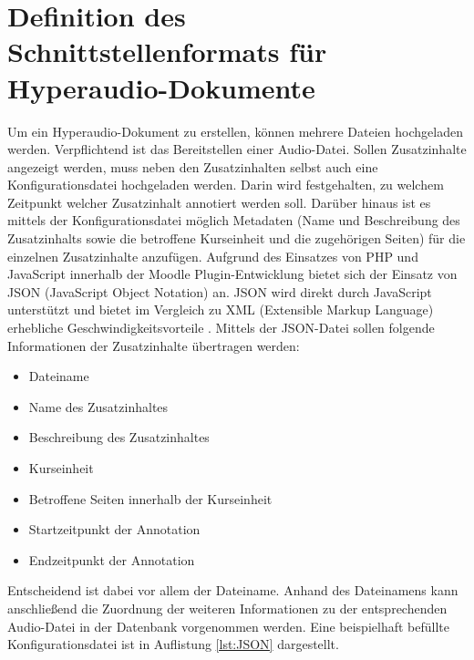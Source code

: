 \section{Definition des Schnittstellenformats für Hyperaudio-Dokumente}
\label{sec:konfigurationsdatei}
Um ein Hyperaudio-Dokument zu erstellen, können mehrere Dateien hochgeladen werden. Verpflichtend ist das Bereitstellen einer Audio-Datei. Sollen Zusatzinhalte angezeigt werden, muss neben den Zusatzinhalten selbst auch eine Konfigurationsdatei hochgeladen werden. Darin wird festgehalten, zu welchem Zeitpunkt welcher Zusatzinhalt annotiert werden soll. Darüber hinaus ist es mittels der Konfigurationsdatei möglich Metadaten (Name und Beschreibung des Zusatzinhalts sowie die betroffene Kurseinheit und die zugehörigen Seiten) für die einzelnen Zusatzinhalte anzufügen.
Aufgrund des Einsatzes von PHP und JavaScript innerhalb der Moodle Plugin-Entwicklung bietet sich der Einsatz von JSON (JavaScript Object Notation) an. JSON wird direkt durch JavaScript unterstützt und bietet im Vergleich zu XML (Extensible Markup Language) erhebliche Geschwindigkeitsvorteile \citep{nurseitov2009comparison}.
Mittels der JSON-Datei sollen folgende Informationen der Zusatzinhalte übertragen werden:

\begin{itemize}
\item Dateiname
\item Name des Zusatzinhaltes
\item Beschreibung des Zusatzinhaltes
\item Kurseinheit
\item Betroffene Seiten innerhalb der Kurseinheit
\item Startzeitpunkt der Annotation
\item Endzeitpunkt der Annotation
\end{itemize}

Entscheidend ist dabei vor allem der Dateiname. Anhand des Dateinamens kann anschließend die Zuordnung der weiteren Informationen zu der entsprechenden Audio-Datei in der Datenbank vorgenommen werden. Eine beispielhaft befüllte Konfigurationsdatei ist in Auflistung \ref{lst:JSON} dargestellt.

